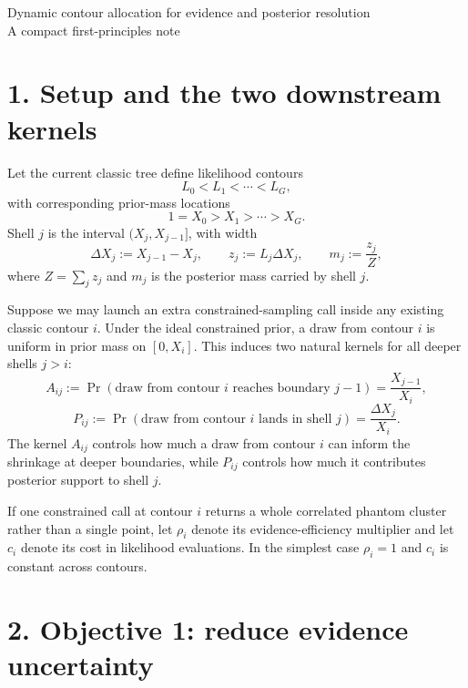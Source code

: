 \documentclass[10pt]{article}
\begin{document}
\small

\begin{center}
{\Large Dynamic contour allocation for evidence and posterior resolution}\\[2mm]
{\normalsize A compact first-principles note}
\end{center}

\section*{1. Setup and the two downstream kernels}

Let the current classic tree define likelihood contours
\[
L_0<L_1<\cdots<L_G,
\]
with corresponding prior-mass locations
\[
1=X_0>X_1>\cdots>X_G.
\]
Shell $j$ is the interval $(X_j,X_{j-1}]$, with width
\[
\Delta X_j := X_{j-1}-X_j,
\qquad
z_j := L_j\Delta X_j,
\qquad
m_j := \frac{z_j}{Z},
\]
where $Z=\sum_j z_j$ and $m_j$ is the posterior mass carried by shell $j$.

Suppose we may launch an extra constrained-sampling call inside any existing classic contour $i$. Under the ideal constrained prior, a draw from contour $i$ is uniform in prior mass on $[0,X_i]$. This induces two natural kernels for all deeper shells $j>i$:
\[
A_{ij}:=\Pr(\text{draw from contour $i$ reaches boundary $j-1$})
=\frac{X_{j-1}}{X_i},
\]
\[
P_{ij}:=\Pr(\text{draw from contour $i$ lands in shell $j$})
=\frac{\Delta X_j}{X_i}.
\]
The kernel $A_{ij}$ controls how much a draw from contour $i$ can inform the shrinkage at deeper boundaries, while $P_{ij}$ controls how much it contributes posterior support to shell $j$.

If one constrained call at contour $i$ returns a whole correlated phantom cluster rather than a single point, let $\rho_i$ denote its evidence-efficiency multiplier and let $c_i$ denote its cost in likelihood evaluations. In the simplest case $\rho_i=1$ and $c_i$ is constant across contours.

\section*{2. Objective 1: reduce evidence uncertainty}
\end{document}
